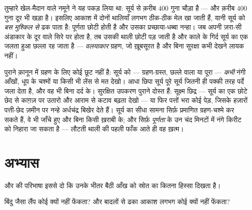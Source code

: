\begin{example}[वह संयोग जो पूर्णता बनाता है]\label{ex:g7:shadows-eclipses:coincidence}
तुम्हारे खेल-मैदान वाले नमूने ने यह पकड़ लिया था: सूर्य  से
क़रीब $400$ गुना चौड़ा है --- और क़रीब $400$ गुना दूर भी खड़ा है।
इसलिए आकाश में दोनों थालियाँ लगभग ठीक-ठीक मेल खा जाती हैं, यानी
 सूर्य को \emph{बस मुश्किल से} ढक पाता है: पूर्णता छोटी होती है
और उसका प्रच्छाया-धब्बा नन्हा। जब  अपनी ज़रा-सी अंडाकार 
के दूर वाले सिरे पर होता है, तब उसकी थाली छोटी पड़ जाती है और काले
 के गिर्द सूर्य का एक जलता हुआ छल्ला रह जाता है ---
\emph{वलयाकार} ग्रहण, जो ख़ूबसूरत है और बिना सुरक्षा कभी देखने लायक
नहीं।
\end{example}

\begin{remark}[बिना रोए देखना]\label{rem:g7:shadows-eclipses:safety}
पुराने क़ानून में ग्रहण के लिए कोई छूट नहीं है: सूर्य को ---
ग्रहण-ग्रस्त, छल्ले वाला या पूरा --- \emph{कभी} नंगी आँखों, धूप के
चश्मों या किसी भी लेंस से मत देखो। आधा छिपा सूर्य पूरे सूर्य जितनी ही
पक्की तरह पर्दे जला देता है, और वह भी बिना दर्द के। सुरक्षित उपकरण
पुराने दोस्त हैं: सूक्ष्म छिद्र --- सूर्य का  एक छोटे छेद से
काग़ज़ पर उतारो और आराम से कटाव बढ़ता देखो --- या फिर पत्तों भरा कोई
पेड़, जिसके हज़ारों पत्ती-छेद ज़मीन पर नन्हे अर्धचंद्र बिखेर देते हैं।
सूर्य का सीधा सामना सिर्फ़ प्रमाणित ग्रहण-चश्मे कर सकते हैं, वे भी
जाँचे हुए और बिना किसी ख़राबी के; और सिर्फ़ \emph{पूर्णता} के उन चंद
मिनटों में नंगे किरीट को निहारा जा सकता है --- लौटती थाली की पहली
फाँक आते ही वह  ख़त्म।
\end{remark}

\section{अभ्यास}

\begin{exercise}[$\star$]\label{exo:g7:shadows-eclipses:1}
 और  की परिभाषा इससे दो कि उनके भीतर बैठी आँख को
स्रोत का कितना हिस्सा दिखता है।
\end{exercise}

\begin{exercise}[$\star$]\label{exo:g7:shadows-eclipses:2}
बिंदु जैसा लैंप कोई  क्यों नहीं फेंकता? और बादलों से ढका आकाश
लगभग कोई  क्यों नहीं फेंकता?
\end{exercise}

